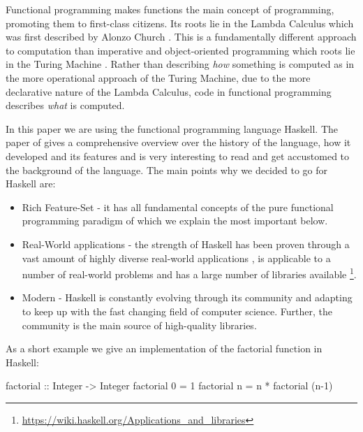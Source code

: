 Functional programming makes functions the main concept of programming, promoting them to first-class citizens. Its roots lie in the Lambda Calculus which was first described by Alonzo Church \citep{church_unsolvable_1936}. This is a fundamentally different approach to computation than imperative and object-oriented programming which roots lie in the Turing Machine \citep{turing_computable_1937}. Rather than describing \textit{how} something is computed as in the more operational approach of the Turing Machine, due to the more declarative nature of the Lambda Calculus, code in functional programming describes \textit{what} is computed.

In this paper we are using the functional programming language Haskell. The paper of \citep{hudak_history_2007} gives a comprehensive overview over the history of the language, how it developed and its features and is very interesting to read and get accustomed to the background of the language. The main points why we decided to go for Haskell are:

\begin{itemize}
	\item Rich Feature-Set - it has all fundamental concepts of the pure functional programming paradigm of which we explain the most important below.
	\item Real-World applications - the strength of Haskell has been proven through a vast amount of highly diverse real-world applications \cite{hudak_history_2007}, is applicable to a number of real-world problems \cite{osullivan_real_2008} and has a large number of libraries available \footnote{\url{https://wiki.haskell.org/Applications_and_libraries}}.
	\item Modern - Haskell is constantly evolving through its community and adapting to keep up with the fast changing field of computer science. Further, the community is the main source of high-quality libraries.
\end{itemize}

As a short example we give an implementation of the factorial function in Haskell:
\begin{HaskellCode}
factorial :: Integer -> Integer
factorial 0 = 1
factorial n = n * factorial (n-1)
\end{HaskellCode}

